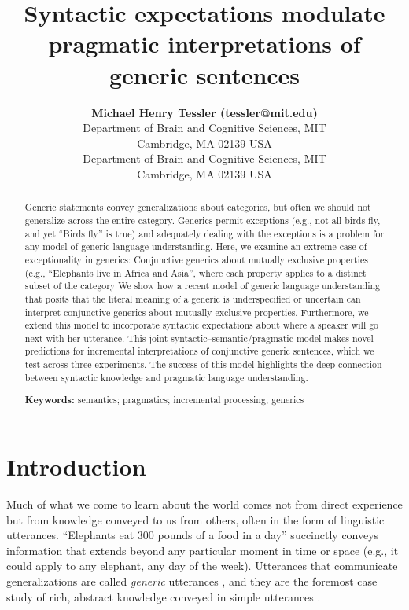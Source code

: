 \documentclass[10pt,letterpaper]{article}
\title{Syntactic expectations modulate pragmatic interpretations of generic sentences}
\author{{\large \bf Michael Henry Tessler (tessler@mit.edu)} \\
  Department of Brain and Cognitive Sciences, MIT \\
  Cambridge, MA 02139 USA
  \AND {\large \bf Roger Levy (rplevy@mit.edu)} \\
  Department of Brain and Cognitive Sciences, MIT \\
  Cambridge, MA 02139 USA}
\begin{document}
\maketitle


\begin{abstract}


Generic statements convey generalizations about categories, but often we should not generalize across the entire category. 
Generics permit exceptions (e.g., not all birds fly, and yet ``Birds fly'' is true) and adequately dealing with the exceptions is a problem for any model of generic language understanding. 
Here, we examine an extreme case of exceptionality in generics: Conjunctive generics about mutually exclusive properties (e.g., ``Elephants live in Africa and Asia'', where each property applies to a distinct subset of the category
We show how a recent model of generic language understanding that posits that the literal meaning of a generic is underspecified or uncertain can interpret conjunctive generics about mutually exclusive properties.  
Furthermore, we extend this model to incorporate syntactic expectations about where a speaker will go next with her utterance.
This joint syntactic--semantic/pragmatic model makes novel predictions for incremental interpretations of conjunctive generic sentences, which we test across three experiments.
The success of this model highlights the deep connection between syntactic knowledge and pragmatic language understanding. 

\textbf{Keywords:} 
semantics; pragmatics; incremental processing; generics
\end{abstract}


\section{Introduction}



Much of what we come to learn about the world comes not from direct experience but from knowledge conveyed to us from others, often in the form of linguistic utterances. 
``Elephants eat 300 pounds of a food in a day'' succinctly conveys information that extends beyond any particular moment in time or space (e.g., it could apply to any elephant, any day of the week). 
Utterances that communicate generalizations are called \emph{generic} utterances \cite{Carlson1977, genericBook}, and they are the foremost case study of rich, abstract knowledge conveyed in simple utterances \cite{Gelman2009}.
\end{document}
